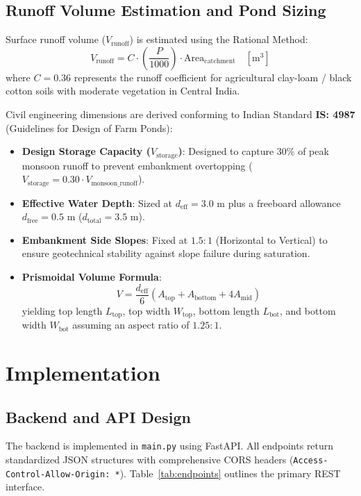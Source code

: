 \documentclass[manuscript,screen,nonacm]{acmart}
\begin{document}
\subsection{Runoff Volume Estimation and Pond Sizing}
Surface runoff volume ($V_{\text{runoff}}$) is estimated using the Rational Method:
\begin{equation}
V_{\text{runoff}} = C \cdot \left(\frac{P}{1000}\right) \cdot \text{Area}_{\text{catchment}} \quad [\text{m}^3]
\end{equation}
where $C = 0.36$ represents the runoff coefficient for agricultural clay-loam / black cotton soils with moderate vegetation in Central India.

Civil engineering dimensions are derived conforming to Indian Standard \textbf{IS: 4987} (Guidelines for Design of Farm Ponds):
\begin{itemize}
    \item \textbf{Design Storage Capacity ($V_{\text{storage}}$)}: Designed to capture 30\% of peak monsoon runoff to prevent embankment overtopping ($V_{\text{storage}} = 0.30 \cdot V_{\text{monsoon\_runoff}}$).
    \item \textbf{Effective Water Depth}: Sized at $d_{\text{eff}} = 3.0\text{ m}$ plus a freeboard allowance $d_{\text{free}} = 0.5\text{ m}$ ($d_{\text{total}} = 3.5\text{ m}$).
    \item \textbf{Embankment Side Slopes}: Fixed at $1.5:1$ (Horizontal to Vertical) to ensure geotechnical stability against slope failure during saturation.
    \item \textbf{Prismoidal Volume Formula}:
    \begin{equation}
    V = \frac{d_{\text{eff}}}{6} \left(A_{\text{top}} + A_{\text{bottom}} + 4 A_{\text{mid}}\right)
    \end{equation}
    yielding top length $L_{\text{top}}$, top width $W_{\text{top}}$, bottom length $L_{\text{bot}}$, and bottom width $W_{\text{bot}}$ assuming an aspect ratio of $1.25:1$.
\end{itemize}

\section{Implementation}
\label{sec:implementation}

\subsection{Backend and API Design}
The backend is implemented in \texttt{main.py} using FastAPI. All endpoints return standardized JSON structures with comprehensive CORS headers (\texttt{Access-Control-Allow-Origin: *}). Table~\ref{tab:endpoints} outlines the primary REST interface.
\end{document}
